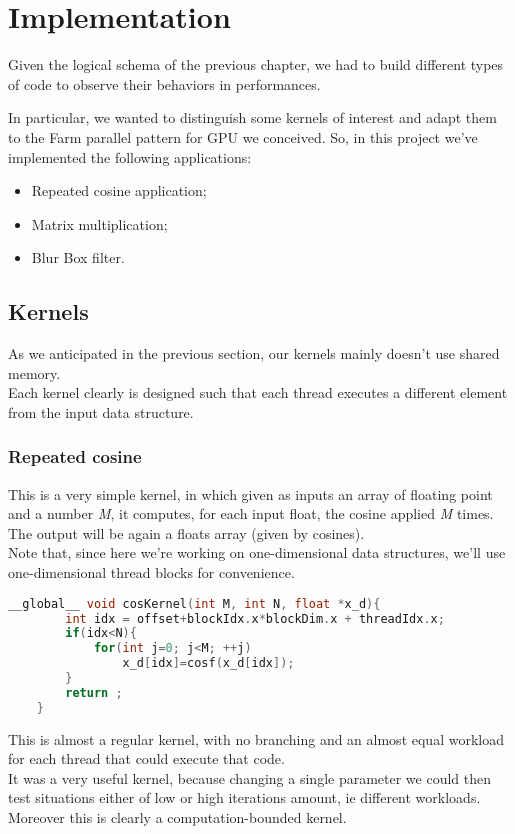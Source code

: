 \chapter{Implementation} 
\label{chap:impl}
Given the logical schema of the previous chapter, we had to build different types of code to observe their behaviors in performances.

In particular, we wanted to distinguish some kernels of interest and adapt them to the Farm parallel pattern for GPU we conceived. So, in this project we've implemented the following applications:
\begin{itemize}
	\item Repeated cosine application;
	\item Matrix multiplication;
	\item Blur Box filter.
\end{itemize}

\section{Kernels}
As we anticipated in the previous section, our kernels mainly doesn't use shared memory.\\
Each kernel clearly is designed such that each thread executes a different element from the input data structure.
\subsection{Repeated cosine}
	This is a very simple kernel, in which given as inputs an array of floating point and a number \textit{M}, it computes, for each input float, the cosine applied \textit{M} times. The output will be again a floats array (given by cosines).\\
	Note that, since here we're working on one-dimensional data structures, we'll use one-dimensional thread blocks for convenience.
	\begin{lstlisting}[language=C++, caption={Implementation for Simple-Computation Kernel}]
	__global__ void cosKernel(int M, int N, float *x_d){  		  
		int idx = offset+blockIdx.x*blockDim.x + threadIdx.x; 		
		if(idx<N){		
			for(int j=0; j<M; ++j)
				x_d[idx]=cosf(x_d[idx]);  		
		}
		return ;
	}
	\end{lstlisting}
	This is almost a regular kernel, with no branching and an almost equal workload for each thread that could execute that code.\\
	It was a very useful kernel, because changing a single parameter we could then test situations either of low or high iterations amount, ie different workloads.
	Moreover this is clearly a computation-bounded kernel.
	
